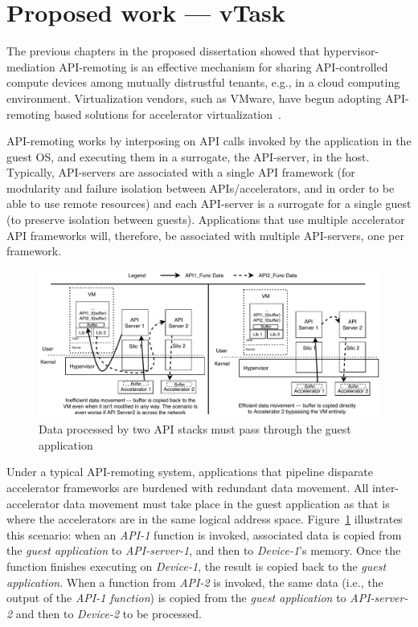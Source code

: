 \section{Proposed work --- vTask}
\label{sec:vTask}

The previous chapters in the proposed dissertation showed that
hypervisor-mediation API-remoting is an effective mechanism for sharing
API-controlled compute devices among mutually distrustful tenants, e.g., in a
cloud computing environment. Virtualization vendors, such as VMware, have
begun adopting API-remoting based solutions for accelerator virtualization~\cite{bitfusion-acquisition}.

API-remoting works by interposing on API calls invoked by the application in
the guest OS, and executing them in a surrogate, the API-server, in the host.
Typically, API-servers are associated with a single API framework (for
modularity and failure isolation between APIs/accelerators, and in order to be
able to use remote resources) and each API-server is a surrogate for a single
guest (to preserve isolation between guests). Applications that use multiple
accelerator API frameworks will, therefore, be associated with multiple
API-servers, one per framework.

\begin{figure}[ht!]
\centering
\captionsetup{justification=centering,width=\linewidth}
\includegraphics[width=\linewidth]{figures/vtask-overview.pdf}
\caption{Data processed by two API stacks must pass through the guest application}
\label{fig:overview}
\end{figure}

Under a typical API-remoting system, applications that pipeline disparate
accelerator frameworks are burdened with redundant data movement. All
inter-accelerator data movement must take place in the guest application as
that is where the accelerators are in the same logical address space.
Figure~\ref{fig:overview} illustrates this scenario: when an \emph{API-1}
function is invoked, associated data is copied from the
\emph{guest application} to \emph{API-server-1}, and then to \emph{Device-1}’s
memory. Once the function finishes executing on \emph{Device-1}, the result is
copied back to the \emph{guest application}. When a function from \emph{API-2}
is invoked, the same data (i.e., the output of the \emph{API-1 function}) is
copied from the \emph{guest application} to \emph{API-server-2} and then to
\emph{Device-2} to be processed.

